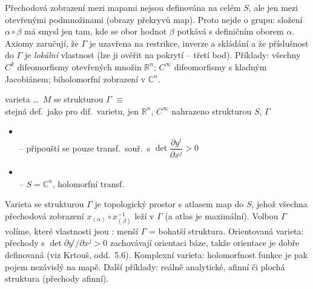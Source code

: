 \begin{vysvetleni}
Přechodová zobrazení mezi mapami nejsou definována na celém $S$, ale jen mezi otevřenými podmnožinami (obrazy překryvů map). Proto nejde o grupu:
složení $\alpha\circ\beta$ má smysl jen tam, kde se obor hodnot $\beta$ potkává s definičním oborem $\alpha$. Axiomy zaručují, že $\Gamma$ je uzavřena
na restrikce, inverze a skládání a že příslušnost do $\Gamma$ je \emph{lokální} vlastnost (lze ji ověřit na pokrytí -- třetí bod).
Příklady: všechny $C^k$ difeomorfismy otevřených množin $\mathbb{R}^n$; $C^\infty$ difeomorfismy s kladným Jacobiánem; biholomorfní zobrazení v $\mathbb{C}^n$.
\end{vysvetleni}

\begin{definice}
varieta \dots\ $M$ se strukturou $\Gamma$ $\equiv$ \\
stejná def.\ jako pro dif.\ varietu, jen $\mathbb{R}^n$, $C^\infty$ nahrazeno strukturou $S$, $\Gamma$
\end{definice}

\begin{priklad}[příklady]
\begin{itemize}[nosep]
  \item {} \\
        -- připouští se pouze transf.\ souř.\ s $\det\dfrac{\partial y^i}{\partial x^j} > 0$
  \item {} \\
        -- $S = \mathbb{C}^n$, holomorfní transf.
\end{itemize}
\end{priklad}

\begin{vysvetleni}
Varieta se strukturou $\Gamma$ je topologický prostor s atlasem map do $S$, jehož všechna přechodová zobrazení $x_{(\alpha)}\circ x_{(\beta)}^{-1}$ leží v $\Gamma$
(a atlas je maximální). Volbou $\Gamma$ volíme, které vlastnosti jsou : menší $\Gamma$ = bohatší struktura.
Orientovaná varieta: přechody s $\det\partial y^i/\partial x^j>0$ zachovávají orientaci báze, takže orientace je dobře definovaná (viz Krtouš, odd.~5.6).
Komplexní varieta: holomorfnost funkce je pak pojem nezávislý na mapě. Další příklady: reálně analytické, afinní či plochá struktura (přechody afinní).
\end{vysvetleni}

\newpage
{}
